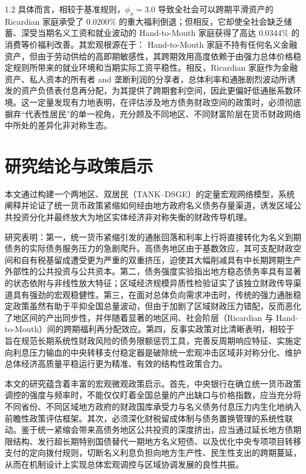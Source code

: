 \documentclass[12pt,UTF8]{ctexart}
\begin{document}
\begin{spacing}{1.2}
		具体而言，相较于基准规则，$\phi_\pi=3.0$ 导致全社会可以跨期平滑资产的 Ricardian 家庭承受了 $0.0200\%$ 的重大福利倒退；但相反，它却使全社会缺乏储蓄、深受当期名义工资和就业波动的 Hand-to-Mouth 家庭获得了高达 $0.0344\%$ 的消费等价福利改善。其宏观根源在于： Hand-to-Mouth 家庭不持有任何名义金融资产，但由于劳动供给的高即期敏感性，其跨期效用高度依赖于由强力总体价格稳定规则所带来的就业环境和当期实际工资平稳性。相反，Ricardian 家庭作为金融资产、私人资本的所有者 and 垄断利润的分享者，总体利率和通胀剧烈波动所诱发的资产负债表付息再分配，为其提供了跨期套利空间，因此更偏好低通胀系数环境。这一定量发现有力地表明，在评估涉及地方债务财政空间的政策时，必须彻底摒弃“代表性居民”的单一视角，充分顾及不同地区、不同财富阶层在货币财政网络中所处的差异化非对称生态。
		
		\section{研究结论与政策启示}
		
		本文通过构建一个两地区、双居民（TANK--DSGE）的定量宏观网络模型，系统阐释并论证了统一货币政策紧缩如何经由地方政府名义债务存量渠道，诱发区域公共投资分化并最终放大为地区实体经济非对称失衡的财政传导机理。
		
		研究表明：第一，统一货币紧缩引发的通胀回落和利率上行将直接转化为名义到期债务的实际债务服务压力的急剧爬升。高债务地区由于基数效应，其可支配财政空间和自有税基留成遭受更为严重的双重挤压，迫使其大幅削减具有中长期跨期生产外部性的公共投资与公共资本。第二，债务强度实验指出地方稳态债务率具有显著的状态依附与非线性放大特征；区域经济规模异质性检验证实了该独立财政传导渠道具有强劲的宏观稳健性。第三，在面对总体负向需求冲击时，传统的强力通胀稳定政策虽然有助于平抑全国总量波动，但由于加剧了区域财政压力错配，反而恶化了地区间的产出同步性，并伴随着显著的地区间、社会阶层（Ricardian 与 Hand-to-Mouth）间的跨期福利再分配效应。第四，反事实政策对比清晰表明，相较于旨在规范长期系统性财政风险的债务限额惩罚工具，完善反周期响应特征、实施定向利息压力输血的中央转移支付稳定器是破除统一宏观冲击区域非对称分化、维护总体经济高质量平稳运行更为精准、有效的结构性政策合力。
		
		本文的研究蕴含着丰富的宏观微观政策启示。首先，中央银行在确立统一货币政策调控的强度与频率时，不能仅仅盯着全国总量的产出缺口与价格指数，应当充分将不同省份、不同区域地方政府的财政国库承受力与名义债务付息压力内生化地纳入前瞻性政策评估框架。其次，必须深化财税留成体制与债务置换管理的系统性联动。鉴于统一紧缩会带来高债务地区公共投资的深度挤出，应当通过延长地方债期限结构、发行超长期特别国债替代一期地方名义短债、以及优化中央专项项目转移支付的定向拨付规则，切断名义利息负担向地方生产性、民生性支出的跨期蔓延，从而在机制设计上实现总体宏观调控与区域协调发展的良性共振。
		
	\end{spacing}
	
\end{document}
